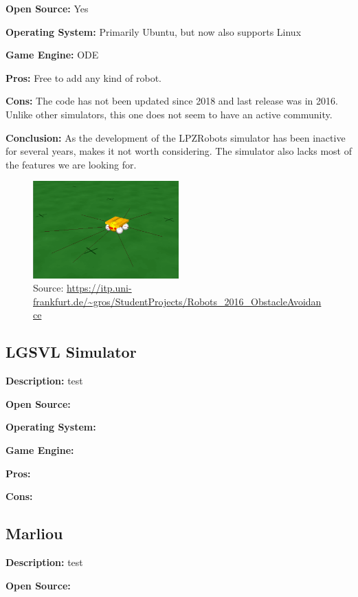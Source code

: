 \textbf{Open Source:} Yes

\textbf{Operating System:} Primarily Ubuntu, but now also supports Linux

\textbf{Game Engine:} ODE

\textbf{Pros:} Free to add any kind of robot.

\textbf{Cons:} The code has not been updated since 2018 and last release was in 2016. Unlike other simulators, this one does not seem to have an active community. 

\textbf{Conclusion:} As the development of the LPZRobots simulator has been inactive for several years, makes it not worth considering. The simulator also lacks most of the features we are looking for. 

\begin{figure}[H]
    \centering
    \includegraphics[width=0.5\textwidth]{Simulators/LPZRobots.png}
    \caption{Source: \url{https://itp.uni-frankfurt.de/~gros/StudentProjects/Robots\_2016\_ObstacleAvoidance}}
\end{figure}


\subsection{LGSVL Simulator} \label{LGSVL_Simulator}
\textbf{Description:} test

\textbf{Open Source:}

\textbf{Operating System:}

\textbf{Game Engine:}

\textbf{Pros:}

\textbf{Cons:}


\subsection{Marliou}
\textbf{Description:} test

\textbf{Open Source:}

